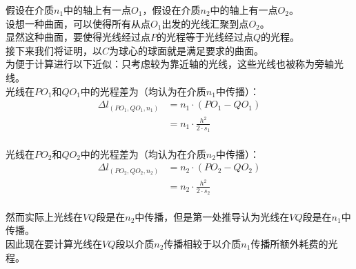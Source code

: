 \documentclass[UTF8]{ctexart}
\begin{document}
    假设在介质$n_1$中的轴上有一点$O_1$，假设在介质$n_2$中的轴上有一点$O_2$。\\[3mm]
    设想一种曲面，可以使得所有从点$O_1$出发的光线汇聚到点$O_2$。\\[3mm]
    显然这种曲面，要使得光线经过点$P$的光程等于光线经过点$Q$的光程。\\[3mm]
    接下来我们将证明，以$C$为球心的球面就是满足要求的曲面。\\[6mm]
    为便于计算进行以下近似：只考虑较为靠近轴的光线，这些光线也被称为旁轴光线。\\[3mm]
    光线在$PO_1$和$QO_1$中的光程差为（均认为在介质$n_1$中传播）：
    \setcounter{equation}{0}
    \begin{align}
        \Delta l_{(PO_1,QO_1,n_1)}
        &=n_1\cdot(PO_1-QO_1)\\[3mm]
        &=n_1\cdot\frac{h^2}{2\cdot s_1}
    \end{align}\\
    光线在$PO_2$和$QO_2$中的光程差为（均认为在介质$n_2$中传播）：
    \begin{align}
        \Delta l_{(PO_2,QO_2,n_2)}
        &=n_2\cdot(PO_2-QO_2)\\[3mm]
        &=n_2\cdot\frac{h^2}{2\cdot s_2}
    \end{align}\\
    然而实际上光线在$VQ$段是在$n_2$中传播，但是第一处推导认为光线在$VQ$段是在$n_1$中传播。\\[3mm]
    因此现在要计算光线在$VQ$段以介质$n_2$传播相较于以介质$n_1$传播所额外耗费的光程。
\end{document}
